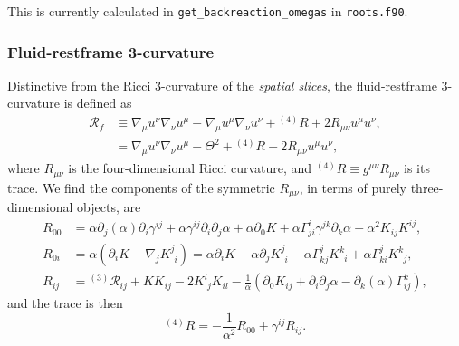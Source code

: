 \documentclass[a4paper]{article}
\newcommand{\ph}{\phantom}
\newcommand{\alp}{\alpha}
\newcommand{\Gam}{\Gamma}
\newcommand{\gam}{\gamma}
\newcommand{\pd}{\partial}
\begin{document}
This is currently calculated in \texttt{get\_backreaction\_omegas} in \texttt{roots.f90}.


\subsubsection{Fluid-restframe 3-curvature}\label{sec:fluidR}

Distinctive from the Ricci 3-curvature of the \emph{spatial slices}, the fluid-restframe 3-curvature \citep{buchert2019} is defined as
\begin{align}
	\mathcal{R}_f &\equiv \nabla_\mu u^\nu \nabla_\nu u^\mu - \nabla_\mu u^\mu \nabla_\nu u^\nu + {}^{(4)}R + 2 R_{\mu\nu} u^\mu u^\nu, \\
	&= \nabla_\mu u^\nu \nabla_\nu u^\mu - \Theta^2 + {}^{(4)}R + 2 R_{\mu\nu} u^\mu u^\nu, \label{eq:fluidR_full}
\end{align}
where $R_{\mu\nu}$ is the four-dimensional Ricci curvature, and ${}^{(4)}R \equiv g^{\mu\nu} R_{\mu\nu}$ is its trace. We find the components of the symmetric $R_{\mu\nu}$, in terms of purely three-dimensional objects, are
\begin{align}
	R_{00} &= \alp \pd_j (\alp) \pd_i \gam^{ij} + \alp \gam^{ij} \pd_i \pd_j \alp + \alp \pd_0 K + \alp \Gam^i_{ji} \gam^{jk}\pd_k \alp - \alp^2 K_{ij}K^{ij}, \\
	R_{0i} & = \alp \left( \pd_i K - \nabla_j K^j_{\ph{j}i} \right) = \alp \pd_i K - \alp \pd_j K^j_{\ph{j}i} - \alp \Gam^j_{kj} K^k_{\ph{k}i} + \alp \Gam^j_{ki} K^k_{\ph{k}j}, \\
	R_{ij} &= {}^{(3)}\mathcal{R}_{ij} + K K_{ij} - 2 K^l_{\ph{l}j} K_{il} - \frac{1}{\alp} \left( \pd_0 K_{ij} + \pd_i \pd_j \alp - \pd_k (\alp) \Gam^k_{ij} \right),
\end{align}
and the trace is then
\begin{equation}
	{}^{(4)}R = - \frac{1}{\alp^2} R_{00} + \gam^{ij} R_{ij}.
\end{equation}
\end{document}

